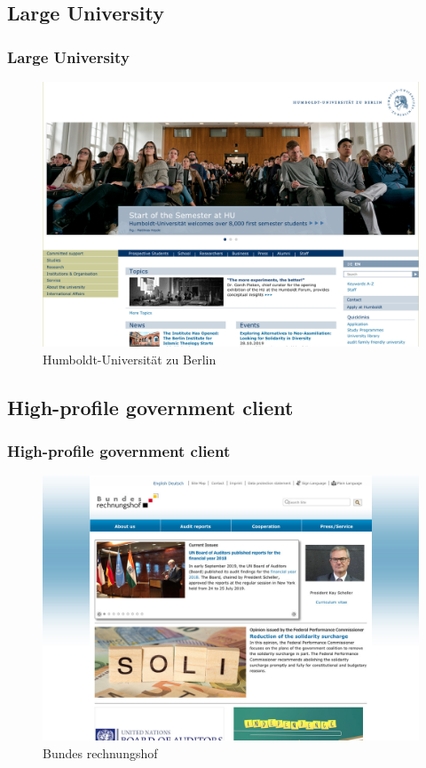 \documentclass[aspectratio=169]{beamer}
\begin{document}
\subsection{Large University}
\begin{frame}
  \frametitle{Large University}
  \begin{figure}
    \includegraphics[height=.7\textheight]{./img/003_-_huberlin.png}
    \caption{Humboldt-Universität zu Berlin}
  \end{figure}
\end{frame}

\subsection{High-profile government client}
\begin{frame}
  \frametitle{High-profile government client}
  \begin{figure}
    \includegraphics[height=.7\textheight]{./img/004_-_brh.jpg}
    \caption{Bundes rechnungshof}
  \end{figure}
\end{frame}
\end{document}
